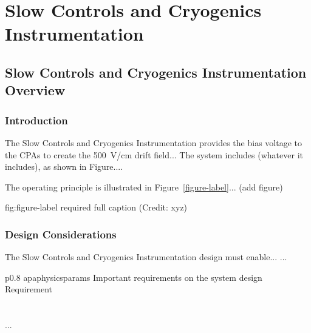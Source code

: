 \chapter{Slow Controls and Cryogenics Instrumentation}
\label{ch:fddp-slow-cryo}

\section{Slow Controls and Cryogenics Instrumentation Overview}
\label{sec:fddp-slow-cryo-ov}


\subsection{Introduction}
\label{sec:fddp-slow-cryo-intro}

The Slow Controls and Cryogenics Instrumentation provides the bias voltage to the CPAs to create the \SI{500}{V/cm} drift field...
The system includes (whatever it includes), as shown in Figure.... 


The operating principle is illustrated in Figure~\ref{figure-label}... (add figure)

\begin{dunefigure}{fig:figure-label}
{required full caption (Credit: xyz)}
\end{dunefigure}

\subsection{Design Considerations}
\label{sec:fddp-slow-cryo-des-consid}


The Slow Controls and Cryogenics Instrumentation design must enable... 
...


\begin{dunetable}
{p{0.8\textwidth}}
{apaphysicsparams}
{Important requirements on the system design}   
Requirement  \\ \toprowrule
  \\ \colhline
   \\ \colhline
 ...\\ 
\end{dunetable}

